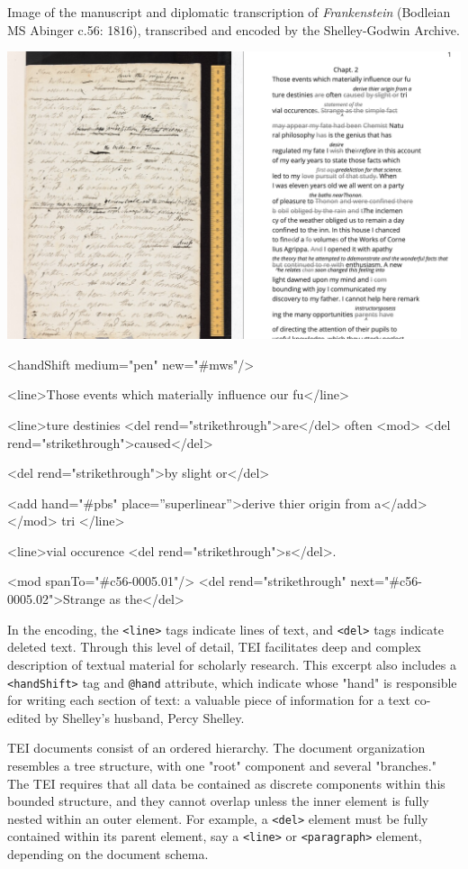 \documentclass[11pt]{article}
\begin{document}
Image of the manuscript and diplomatic transcription of \emph{Frankenstein}
(Bodleian MS Abinger c.56: 1816), transcribed and encoded by the
Shelley-Godwin Archive.

\begin{center}
\includegraphics[width=.9\linewidth]{./figure1.png}
\end{center}

\begin{SOURCE}
<handShift medium="pen" new="\#mws"/>

<line>Those events which materially influence our fu</line>

<line>ture destinies <del rend="strikethrough">are</del> often
<mod> <del rend="strikethrough">caused</del>

<del rend="strikethrough">by slight or</del>

<add hand="\#pbs" place=”superlinear”>derive thier origin from a</add>
</mod> tri </line>

<line>vial occurence <del rend="strikethrough">s</del>.

<mod spanTo="\#c56-0005.01"/> <del rend="strikethrough"
next="\#c56-0005.02">Strange as the</del>
\end{SOURCE}

In the encoding, the \texttt{<line>} tags indicate lines of text, and \texttt{<del>}
tags indicate deleted text. Through this level of detail, TEI
facilitates deep and complex description of textual material for
scholarly research. This excerpt also includes a \texttt{<handShift>} tag and
\texttt{@hand} attribute, which indicate whose "hand" is responsible for
writing each section of text: a valuable piece of information for a
text co-edited by Shelley's husband, Percy Shelley.

TEI documents consist of an ordered hierarchy. The document
organization resembles a tree structure, with one "root" component and
several "branches."  The TEI requires that all data be contained as
discrete components within this bounded structure, and they cannot
overlap unless the inner element is fully nested within an outer
element. For example, a \texttt{<del>} element must be fully contained within
its parent element, say a \texttt{<line>} or \texttt{<paragraph>} element, depending
on the document schema.
\end{document}
